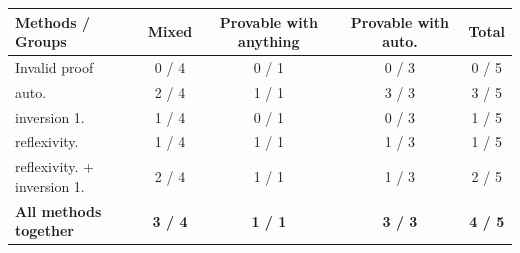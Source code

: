 \begin{table}
\centering
\begin{tabular}{lcccc}
\toprule
\textbf{Methods / Groups} & \textbf{Mixed} & \textbf{Provable with anything} & \textbf{Provable with auto.} & \textbf{Total} \\
\midrule
Invalid proof & 0 / 4 & 0 / 1 & 0 / 3 & 0 / 5 \\
auto. & 2 / 4 & 1 / 1 & 3 / 3 & 3 / 5 \\
inversion 1. & 1 / 4 & 0 / 1 & 0 / 3 & 1 / 5 \\
reflexivity. & 1 / 4 & 1 / 1 & 1 / 3 & 1 / 5 \\
reflexivity. + inversion 1. & 2 / 4 & 1 / 1 & 1 / 3 & 2 / 5 \\
\textbf{All methods together} & \textbf{3 / 4} & \textbf{1 / 1} & \textbf{3 / 3} & \textbf{4 / 5} \\
\bottomrule
\end{tabular}
\end{table}
